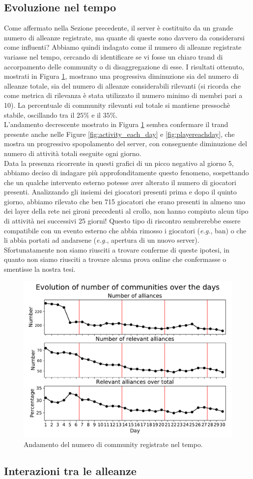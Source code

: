 \subsection{Evoluzione nel tempo}
Come affermato nella Sezione precedente, il server è costituito da un grande numero di alleanze registrate, ma quante di queste sono davvero da considerarsi come influenti? Abbiamo quindi indagato come il numero di alleanze registrate variasse nel tempo, cercando di identificare se vi fosse un chiaro trand di accorpamento delle community o di disaggregazione di esse. I risultati ottenuto, mostrati in Figura \ref{fig:allianceseachday}, mostrano una progressiva diminuzione sia del numero di alleanze totale, sia del numero di alleanze considerabili rilevanti (si ricorda che come metrica di rilevanza è stata utilizzato il numero minimo di membri pari a 10). La percentuale di community rilevanti sul totale si mantiene pressochè stabile, oscillando tra il $25\%$ e il $35\%$.\\
L'andamento decrescente mostrato in Figura \ref{fig:allianceseachday} sembra confermare il trand presente anche nelle Figure \ref{fig:activity_each_day} e \ref{fig:playereachday}, che mostra un progressivo spopolamento del server, con conseguente diminuzione del numero di attività totali eseguite ogni giorno.\\
Data la presenza ricorrente in questi grafici di un picco negativo al giorno 5, abbiamo deciso di indagare più approfonditamente questo fenomeno, sospettando che un qualche intervento esterno potesse aver alterato il numero di giocatori presenti. Analizzando gli insiemi dei giocatori presenti prima e dopo il quinto giorno, abbiamo rilevato che ben 715 giocatori che erano presenti in almeno uno dei layer della rete nei gironi precedenti al crollo, non hanno compiuto alcun tipo di attività nei successivi 25 giorni! Questo tipo di riscontro sembrerebbe essere compatibile con un evento esterno che abbia rimosso i giocatori (\textit{e.g.}, ban) o che li abbia portati ad andarsene (\textit{e.g.}, apertura di un nuovo server). Sfortunatamente non siamo riusciti a trovare conferme di queste ipotesi, in quanto non siamo riusciti a trovare alcuna prova online che confermasse o smentisse la nostra tesi.
\begin{figure}
	\centering
	\includegraphics[width=0.85\linewidth]{images/alliances_each_day}
	\caption{Andamento del numero di community registrate nel tempo.}
	\label{fig:allianceseachday}
\end{figure}


\subsection{Interazioni tra le alleanze}
